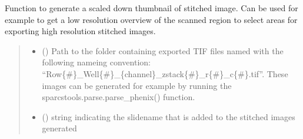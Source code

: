 \documentclass[a4paper,10pt,english,openany,oneside]{sphinxmanual}
\begin{document}
\begin{fulllineitems}
\label{\detokenize{pages/modules:sparcstools.stitch.generate_stitched}}
\pysigstartsignatures
{}
\pysigstopsignatures
\sphinxAtStartPar
Function to generate a scaled down thumbnail of stitched image. Can be used for example to
get a low resolution overview of the scanned region to select areas for exporting high resolution
stitched images.
\begin{quote}\begin{description}
\begin{itemize}
\item {} 
\sphinxAtStartPar
{} () \textendash{} Path to the folder containing exported TIF files named with the following nameing convention: “Row\{\#\}\_Well\{\#\}\_\{channel\}\_zstack\{\#\}\_r\{\#\}\_c\{\#\}.tif”.
These images can be generated for example by running the sparcstools.parse.parse\_phenix() function.

\item {} 
\sphinxAtStartPar
{} () \textendash{} string indicating the slidename that is added to the stitched images generated


\end{itemize}
\end{description}
\end{quote}
\end{fulllineitems}
\end{document}
